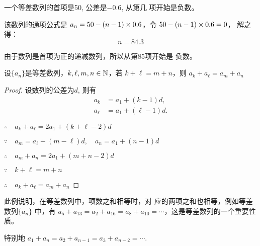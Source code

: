 \begin{example}
    一个等差数列的首项是50, 公差是$-0.6$, 从第几
项开始是负数。
\end{example}

\begin{solution}    
该数列的通项公式是
$a_n=50-(n-1)\times0.6$，令
$50-(n-1)\times0.6=0$，
解之得：$$n=84.3$$

由于数列是首项为正的递减数列，所以从第85项开始是
负数。
\end{solution}





\begin{example}
设$\{a_n\}$是等差数列，$k,\ell,m,n\in\mathbb{N}$，若
$k+\ell=m+n$，则
$a_k+a_{\ell}=a_m+a_n$
\end{example}

\begin{proof}
    设数列的公差为$d$, 则有
\[\begin{split}
     a_k&=a_1+(k-1)d,\\
a_{\ell}&=a_1+(\ell-1)d.
\end{split}\]

$\therefore\quad a_k+a_{\ell}=2a_1+(k+\ell-2)d$

$\because\quad a_m=a_{\ell}+(m-\ell)d,\quad a_n=a_1+(n-1)d$

$\therefore\quad a_m+a_n=2a_1+(m+n-2)d$

$\because\quad k+\ell=m+n$

$\therefore\quad a_k+a_{\ell}=a_m+a_n$
\end{proof}

\begin{rmk}
    此例说明，在等差数列中，项数之和相等时，对
应的两项之和也相等，例如等差数列$\{a_n\}$
中，有
$a_5+a_{13}=a_2+a_{16}=a_8+a_{10}=\cdots$，这是等差数列的一个重要性质。

特别地
$a_1+a_n=a_2+a_{n-1}=a_3+a_{n-2}=\cdots$.
\end{rmk}

